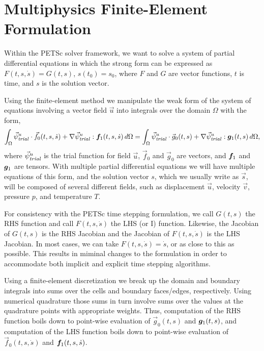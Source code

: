 \section{Multiphysics Finite-Element Formulation}
\label{sec:multiphysics:formulation}

Within the PETSc solver framework, we want to solve a system of
partial differential equations in which the strong form can be
expressed as $F(t,s,\dot{s}) = G(t,s)$, $s(t_0) = s_0$, where $F$ and
$G$ are vector functions, $t$ is time, and $s$ is the solution vector.

Using the finite-element method we manipulate the weak form of the
system of equations involving a vector field $\vec{u}$ into integrals
over the domain $\Omega$ with the form,
\begin{equation}
  \label{eqn:problem:form}
  \int_\Omega \trialvec[u] \cdot \vec{f}_0(t,s,\dot{s}) + \nabla \trialvec[u] : \tensor{f}
_1(t,s,\dot{s}) \, 
d\Omega =
  \int_\Omega \trialvec[u] \cdot \vec{g}_0(t,s) + \nabla \trialvec[u] : \tensor{g}_1(t,s) \, 
d\Omega,
\end{equation}
where $\trialvec[u]$ is the trial function for field $\vec{u}$,
$\vec{f}_0$ and $\vec{g}_0$ are vectors, and $\tensor{f}_1$ and
$\tensor{g}_1$ are tensors. With multiple partial differential
equations we will have multiple equations of this form, and the
solution vector $s$, which we usually write as $\vec{s}$, will be
composed of several different fields, such as displacement $\vec{u}$,
velocity $\vec{v}$, pressure $p$, and temperature $T$.

For consistency with the PETSc time stepping formulation, we call
$G(t,s)$ the RHS function and call $F(t,s,\dot{s})$ the LHS (or I)
function. Likewise, the Jacobian of $G(t,s)$ is the RHS Jacobian and
the Jacobian of $F(t,s,\dot{s})$ is the LHS Jacobian. In most cases,
we can take $F(t,s,\dot{s}) = \dot{s}$, or as close to this as
possible. This results in miminal changes to the formulation in order
to accommodate both implicit and explicit time stepping algorithms.

Using a finite-element discretization we break up the domain and
boundary integrals into sums over the cells and boundary faces/edges,
respectively. Using numerical quadrature those sums in turn involve
sums over the values at the quadrature points with appropriate
weights. Thus, computation of the RHS function boils down to
point-wise evaluation of $\vec{g}_0(t,s)$ and $\tensor{g}_1(t,s)$, and
computation of the LHS function boils down to point-wise evaluation of
$\vec{f}_0(t,s,\dot{s})$ and $\tensor{f}_1(t,s,\dot{s})$.

